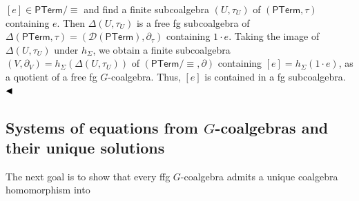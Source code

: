 \documentclass[11pt,a4paper]{amsart}
\begin{document}
\hypertarget{html:S6.SS0.SSS0.P0.SPx3.p1.m6}{}\({[e]\in\mathsf{PTerm}/{\equiv}}\) and find a finite subcoalgebra %
\hypertarget{html:S6.SS0.SSS0.P0.SPx3.p1.m7}{}\({(U,\tau_{U})}\) of %
\hypertarget{html:S6.SS0.SSS0.P0.SPx3.p1.m8}{}\({(\mathsf{PTerm},\tau)}\) containing %
\hypertarget{html:S6.SS0.SSS0.P0.SPx3.p1.m9}{}\({e}\). Then %
\hypertarget{html:S6.SS0.SSS0.P0.SPx3.p1.m10}{}\({\Delta(U,\tau_{U})}\) is a free fg subcoalgebra of %
\hypertarget{html:S6.SS0.SSS0.P0.SPx3.p1.m11}{}\({\Delta(\mathsf{PTerm},\tau)=({\mathcal{D}}(\mathsf{PTerm}),\partial_{\tau})}\) containing %
\hypertarget{html:S6.SS0.SSS0.P0.SPx3.p1.m12}{}\({1\cdot e}\). Taking the image of %
\hypertarget{html:S6.SS0.SSS0.P0.SPx3.p1.m13}{}\({\Delta(U,\tau_{U})}\) under %
\hypertarget{html:S6.SS0.SSS0.P0.SPx3.p1.m14}{}\({h_{\Sigma}}\), we obtain a finite subcoalgebra %
\hypertarget{html:S6.SS0.SSS0.P0.SPx3.p1.m15}{}\({(V,\partial_{V})=h_{\Sigma}(\Delta(U,\tau_{U}))}\) of %
\hypertarget{html:S6.SS0.SSS0.P0.SPx3.p1.m16}{}\({(\mathsf{PTerm}/{\equiv},\partial)}\) containing %
\hypertarget{html:S6.SS0.SSS0.P0.SPx3.p1.m17}{}\({[e]=h_{\Sigma}(1\cdot e)}\), as a quotient of a free fg %
\hypertarget{html:S6.SS0.SSS0.P0.SPx3.p1.m18}{}\({G}\)-coalgebra. Thus, %
\hypertarget{html:S6.SS0.SSS0.P0.SPx3.p1.m19}{}\({[e]}\) is contained in a fg subcoalgebra. %
\hypertarget{html:S6.SS0.SSS0.P0.SPx3.p1.m20}{}\({\hfill\blacktriangleleft}\)
\par\medskip
\hypertarget{html:S6.SSx1}{} %
\hypertarget{html:S6.SSx1.m1}{}\subsection*{Systems of equations from \({G}\)-coalgebras and their unique solutions}
\hypertarget{html:S6.SSx1.p1}{} The next goal is to show that every ffg %
\hypertarget{html:S6.SSx1.p1.m1}{}\({G}\)-coalgebra admits a unique coalgebra homomorphism into %
\end{document}
